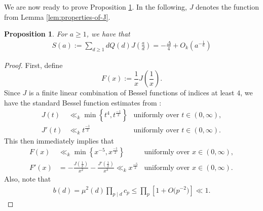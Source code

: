 \documentclass[12pt,letterpaper,reqno]{amsart}
\theoremstyle{plain}
\newtheorem{proposition}[theorem]{Proposition}
\theoremstyle{definition}
\numberwithin{equation}{section}
\numberwithin{figure}{section}
\numberwithin{table}{section}
\newcommand{\lrp}[1]{\!\left(#1\right)}
\newcommand{\lrb}[1]{\!\left[#1\right]}
\newcommand{\lrcb}[1]{\!\left\{#1\right\}}
\begin{document}
We are now ready to prove Proposition \ref{prop:S-estimate}. In the following, $J$ denotes the function from Lemma \ref{lem:properties-of-J}.
\begin{proposition} \label{prop:S-estimate}
    For $a\ge 1$, we have that
    \begin{align}
        S(a):=\sum_{d\ge 1}dQ(d)J\lrp{\frac{a}{d}} = -\frac{\Delta}{4} + O_k\lrp{a^{-\frac{1}{6}}} 
    \end{align}
\end{proposition}
\begin{proof}
First, define
\[
    F(x):=\frac{1}{x}J\lrp{\frac{1}{x}}.
\]
Since $J$ is a finite linear combination of Bessel functions of indices at least $4$,
we have the standard Bessel function estimates from \cite[Sections 10.14 and 10.17]{NIST-DLMF}:
\begin{align}
    J(t)
    &\ll_k
    \min\lrcb{t^4, t^{\frac{-1}{2}}}
    &
    \text{uniformly over $t \in (0,\infty)$},
    \\
    J'(t)
    &\ll_k
    t^{\frac{-1}{2}}
    &
    \text{uniformly over $t \in (0,\infty)$}.
\end{align}
This then immediately implies that
\begin{align} 
    F(x)
    &\ll_k
    \min\lrcb{x^{-5}, x^{\frac{-1}{2}}}
    &
    \text{uniformly over $x \in (0,\infty)$},
    \label{eq:F-bounds}
    \\
    F'(x)
    &=
    -\frac{J\lrp{\frac{1}{x}}}{x^2}
    -
    \frac{J'\lrp{\frac{1}{x}}}{x^3}
    \ll_k
    x^{\frac{-5}{2}}
    &
    \text{uniformly over $x \in (0,\infty)$}.
    \label{eq:F'-bounds}
\end{align}
Also, note that
\begin{align}
    \label{eqn:b(d)<<1}
    b(d)
    =
    \mu^2(d)
    \prod_{p\mid d}c_p
    \le
    \prod_p \lrb{1 + O\big(p^{-2}\big)}
    \ll1.
\end{align}



\end{proof}
\end{document}
